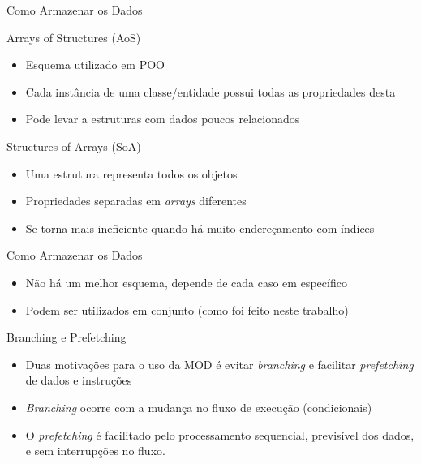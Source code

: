 \documentclass{beamer}
\begin{document}
\begin{frame}{Como Armazenar os Dados}
    \begin{minipage}[b]{0.4\textwidth}
        Arrays of Structures (AoS)
        \begin{itemize}
            \item Esquema utilizado em POO
            \item Cada instância de uma classe/entidade possui todas as propriedades desta
            \item Pode levar a estruturas com dados poucos relacionados
        \end{itemize}
    \end{minipage}
    \hspace{1.5cm}
    \begin{minipage}[b]{0.4\textwidth}
        Structures of Arrays (SoA)
        \begin{itemize}
            \item Uma estrutura representa todos os objetos
            \item Propriedades separadas em \textit{arrays} diferentes
            \item Se torna mais ineficiente quando há muito endereçamento com índices
        \end{itemize}
    \end{minipage}
\end{frame}

\begin{frame}{Como Armazenar os Dados}
    \begin{itemize}
        \item Não há um melhor esquema, depende de cada caso em específico
        \item Podem ser utilizados em conjunto (como foi feito neste trabalho)
    \end{itemize}
\end{frame}

\begin{frame}{Branching e Prefetching}
    \begin{itemize}
        \item Duas motivações para o uso da MOD é evitar \textit{branching} 
              e facilitar \textit{prefetching} de dados e instruções
        \item \textit{Branching} ocorre com a mudança no fluxo de execução (condicionais)
        \item O \textit{prefetching} é facilitado pelo processamento sequencial, previsível 
            dos dados, e sem interrupções no fluxo.
    \end{itemize}
\end{frame}
\end{document}
